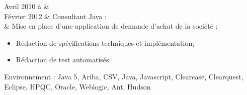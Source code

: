 Avril 2010 à & \\%
Février 2012 & Consultant Java :\\%
			 & Mise en place d'une application de demande d'achat de la société :%
\begin{itemize}%
    \item Rédaction de spécifications techniques et implémentation;%
    \item Rédaction de test automatisés.%
\end{itemize}%
Environnement : Java 5, Ariba, CSV, Java, Javascript, Clearcase, Clearquest, Eclipse, HPQC, Oracle, Weblogic, Ant, Hudson